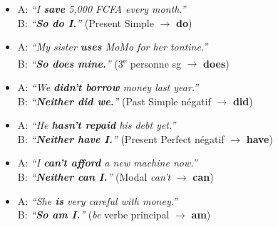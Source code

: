 \documentclass[11pt]{article}
\begin{document}
\begin{exemplebox}
\begin{itemize}
\item A: \emph{``I \textbf{save} 5,000 FCFA every month.''} \\
      B: \emph{``\textbf{So do I.}''} (Present Simple $\rightarrow$ \textbf{do})
\item A: \emph{``My sister \textbf{uses} MoMo for her tontine.''} \\
      B: \emph{``\textbf{So does mine.}''} (3\textsuperscript{e} personne sg $\rightarrow$ \textbf{does})
\item A: \emph{``We \textbf{didn't borrow} money last year.''} \\
      B: \emph{``\textbf{Neither did we.}''} (Past Simple négatif $\rightarrow$ \textbf{did})
\item A: \emph{``He \textbf{hasn't repaid} his debt yet.''} \\
      B: \emph{``\textbf{Neither have I.}''} (Present Perfect négatif $\rightarrow$ \textbf{have})
\item A: \emph{``I \textbf{can't afford} a new machine now.''} \\
      B: \emph{``\textbf{Neither can I.}''} (Modal \emph{can't} $\rightarrow$ \textbf{can})
\item A: \emph{``She \textbf{is} very careful with money.''} \\
      B: \emph{``\textbf{So am I.}''} (\emph{be} verbe principal $\rightarrow$ \textbf{am})
\end{itemize}
\end{exemplebox}
\end{document}
